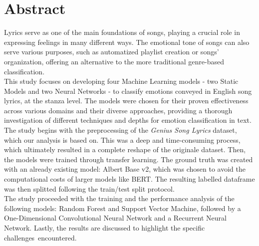 \firstchapter
\chapter*{Abstract}
\label{ch:abstract}
Lyrics serve as one of the main foundations of songs, playing a crucial role in
expressing feelings in many different ways.
The emotional tone of songs can also serve various purposes, such as
automatized playlist creation or songs' organization,
offering an alternative to the more traditional genre-based classification.\\

This study focuses on developing four Machine Learning models - two Static Models
and two Neural Networks - to classify emotions conveyed in English song lyrics,
at the stanza level.
The models were chosen for their proven effectiveness across various domains and
their diverse approaches, providing a thorough investigation of different
techniques and depths for emotion classification in text.\\

The study begins with the preprocessing of the \textit{Genius Song Lyrics} dataset, which our analysis is based on. This was a deep and time-consuming process, which ultimately resulted in a complete reshape of the originale dataset. Then, the models were trained through transfer learning. The ground truth was created with an already existing model: Albert Base v2, which was chosen to avoid the computational costs of larger models like BERT. The resulting labelled dataframe was then splitted following the train/test split protocol. \\
The study proceeded with the training and the performance analysis of the following models: Random Forest and Support Vector Machine, followed by a One-Dimensional Convolutional Neural Network and a Recurrent Neural Network. Lastly, the results are discussed to highlight the specific challenges encountered.